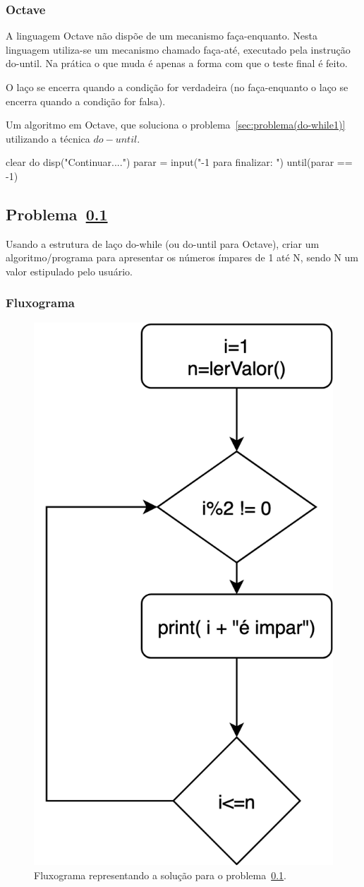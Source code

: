 \subsubsection*{Octave}
A linguagem Octave não dispõe de  um mecanismo faça-enquanto. Nesta linguagem utiliza-se um mecanismo chamado faça-até, executado pela instrução do-until. Na prática o que muda é apenas a forma com que o teste final é feito. 

O laço se encerra quando a condição for verdadeira (no faça-enquanto o laço se encerra quando a condição for falsa). 

Um algoritmo em Octave, que soluciona o problema~\ref{sec:problema(do-while1)} utilizando a técnica $do-until$.
\begin{code}
clear
do
  disp("Continuar....")
  parar = input("-1 para finalizar: ")
until(parar == -1)
\end{code}


\subsection{Problema~\ref{sec:problema(do-while2)}}
\label{sec:problema(do-while2)}

Usando a estrutura de laço do-while (ou do-until para Octave), criar um algoritmo/programa para apresentar os números ímpares de 1 até N, sendo N um valor estipulado pelo usuário.

\subsubsection*{Fluxograma}
\begin{figure}[h]
  \begin{center}
    \includegraphics[width=0.4\linewidth]{img/problemaDoWhile2.png}
    \caption{Fluxograma representando a solução para o problema~\ref{sec:problema(do-while2)}.}
    \label{fig:problema(do-while2)}
  \end{center}
\end{figure}

